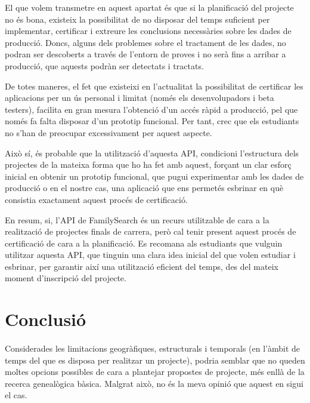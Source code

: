     El que volem transmetre en aquest apartat és que si la planificació del projecte no és bona, existeix la possibilitat de no disposar del temps suficient per implementar, certificar i extreure les conclusions necessàries sobre les dades de producció. Doncs, alguns dels problemes sobre el tractament de les dades, no podran ser descoberts a través de l'entorn de proves i no serà fins a arribar a producció, que aquests podràn ser detectats i tractats.

    De totes maneres, el fet que existeixi en l'actualitat la possibilitat de certificar les aplicacions per un ús personal i limitat (només els desenvolupadors i beta testers), facilita en gran mesura l'obtenció d'un accés ràpid a producció, pel que només fa falta disposar d'un prototip funcional. Per tant, crec que els estudiants no s'han de preocupar excessivament per aquest aspecte.

    Això sí, és probable que la utilització d'aquesta API, condicioni l'estructura dels projectes de la mateixa forma que ho ha fet amb aquest, forçant un clar esforç inicial en obtenir un prototip funcional, que pugui experimentar amb les dades de producció o en el nostre cas, una aplicació que ens permetés esbrinar en què consistia exactament aquest procés de certificació.

    En resum, si, l'API de FamilySearch és un recurs utilitzable de cara a la realització de projectes finals de carrera, però cal tenir present aquest procés de certificació de cara a la planificació. Es recomana als estudiants que vulguin utilitzar aquesta API, que tinguin una clara idea inicial del que volen estudiar i esbrinar, per garantir així una utilització eficient del temps, des del mateix moment d'inscripció del projecte.


\section{Conclusió}

    \paragraph{}
    Considerades les limitacions geogràfiques, estructurals i temporals (en l'àmbit de temps del que es disposa per realitzar un projecte), podria semblar que no queden moltes opcions possibles de cara a plantejar propostes de projecte, més enllà de la recerca genealògica bàsica. Malgrat això, no és la meva opinió que aquest en sigui el cas.

